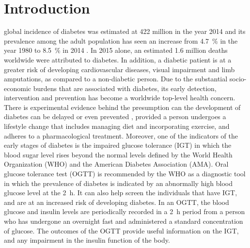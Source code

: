 \documentclass[journal,comsoc]{IEEEtran}
\renewcommand{\^}{\hat}  %
\begin{document}
\section{Introduction}
%
%
%
%
 global incidence of diabetes was estimated at \num{422} million in the year \num{2014} and its prevalence among the adult population has seen an increase from \SI{4.7}{\percent} in the year \num{1980} to \SI{8.5}{\percent} in \num{2014} \cite{mathers_projections_2006}. In \num{2015} alone, an estimated \num{1.6} million deaths worldwide were attributed to diabetes. In addition, a diabetic patient is at a greater risk of developing cardiovascular diseases, visual impairment and limb amputations, as compared to a non-diabetic person. Due to the substantial socio-economic burdens that are associated with diabetes, its early detection, intervention and prevention has become a worldwide top-level health concern.
%
%
There is experimental evidence behind the presumption can the development of diabetes can be delayed or even prevented \cite{tuomilehto2001prevention}, provided a person undergoes a lifestyle change that includes managing diet and incorporating exercise, and adheres to a pharmacological treatment. Moreover, one of the indicators of the early stages of diabetes is the impaired glucose tolerance (IGT) in which the blood sugar level rises beyond the normal levels defined by the World Health Organization (WHO) and the American Diabetes Association (AMA). Oral glucose tolerance test (OGTT) is recommended by the WHO as a diagnostic tool in which the prevalence of diabetes is indicated by an abnormally high blood glucose level at the \SI{2}{\hour}. It can also help screen the individuals that have IGT, and are at an increased risk of developing diabetes. In an OGTT, the blood glucose and insulin levels are periodically recorded in a \SI{2}{\hour} period from a person who has undergone an overnight fast and administered a standard concentration of glucose. The outcomes of the OGTT provide useful information on the IGT, and any impairment in the insulin function of the body.
\end{document}
